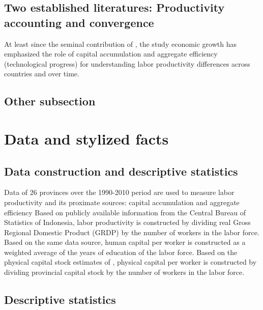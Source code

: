 \documentclass[11pt,a4paper,]{article}
\begin{document}
\hypertarget{two-established-literatures-productivity-accounting-and-convergence}{%
\subsection{Two established literatures: Productivity accounting and convergence}\label{two-established-literatures-productivity-accounting-and-convergence}}

At least since the seminal contribution of \textcite{solow1956contribution}, the study economic growth has emphasized the role of capital accumulation and aggregate efficiency (technological progress) for understanding labor productivity differences across countries and over time.

\hypertarget{other-subsection}{%
\subsection{Other subsection}\label{other-subsection}}

\hypertarget{data-and-stylized-facts}{%
\section{Data and stylized facts}\label{data-and-stylized-facts}}

\hypertarget{data-construction-and-descriptive-statistics}{%
\subsection{Data construction and descriptive statistics}\label{data-construction-and-descriptive-statistics}}

Data of 26 provinces over the 1990-2010 period are used to measure labor productivity and its proximate sources: capital accumulation and aggregate efficiency
Based on publicly available information from the Central Bureau of Statistics of Indonesia, labor productivity is constructed by dividing real Gross Regional Domestic Product (GRDP) by the number of workers in the labor force.
Based on the same data source, human capital per worker is constructed as a weighted average of the years of education of the labor force.
Based on the physical capital stock estimates of \textcite{kataoka2013capital}, physical capital per worker is constructed by dividing provincial capital stock by the number of workers in the labor force.

\hypertarget{descriptive-statistics}{%
\subsection{Descriptive statistics}\label{descriptive-statistics}}
\end{document}
